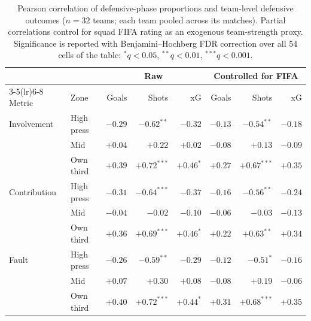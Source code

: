 \begin{table}[H]
\centering
\small
\setlength{\tabcolsep}{5pt}
\begin{tabular}{ll rrr rrr}
\toprule
& & \multicolumn{3}{c}{Raw} & \multicolumn{3}{c}{Controlled for FIFA} \\
\cmidrule(lr){3-5}\cmidrule(lr){6-8}
Metric & Zone & Goals & Shots & xG & Goals & Shots & xG \\
\midrule
Involvement & High press & $-0.29$ & $-0.62^{**}$  & $-0.32$      & $-0.13$ & $-0.54^{**}$  & $-0.18$ \\
& Mid                    & $+0.04$ & $+0.22$       & $+0.02$      & $-0.08$ & $+0.13$       & $-0.09$ \\
& Own third              & $+0.39$ & $+0.72^{***}$ & $+0.46^{*}$  & $+0.27$ & $+0.67^{***}$ & $+0.35$ \\
\addlinespace
Contribution & High press& $-0.31$ & $-0.64^{***}$ & $-0.37$      & $-0.16$ & $-0.56^{**}$  & $-0.24$ \\
& Mid                    & $-0.04$ & $-0.02$       & $-0.10$      & $-0.06$ & $-0.03$       & $-0.13$ \\
& Own third              & $+0.36$ & $+0.69^{***}$ & $+0.46^{*}$  & $+0.22$ & $+0.63^{**}$  & $+0.34$ \\
\addlinespace
Fault & High press       & $-0.26$ & $-0.59^{**}$  & $-0.29$      & $-0.12$ & $-0.51^{*}$   & $-0.16$ \\
& Mid                    & $+0.07$ & $+0.30$       & $+0.08$      & $-0.08$ & $+0.19$       & $-0.06$ \\
& Own third              & $+0.40$ & $+0.72^{***}$ & $+0.44^{*}$  & $+0.31$ & $+0.68^{***}$ & $+0.35$ \\
\bottomrule
\end{tabular}
\caption{Pearson correlation of defensive-phase proportions and team-level defensive
outcomes ($n=32$ teams; each team pooled across its matches). Partial correlations
control for squad FIFA rating as an exogenous team-strength proxy. Significance is
reported with Benjamini--Hochberg FDR correction over all 54 cells of the table:
$^{*}q<0.05$, $^{**}q<0.01$, $^{***}q<0.001$.}
\label{tab:style-outcome-corr}
\end{table}
